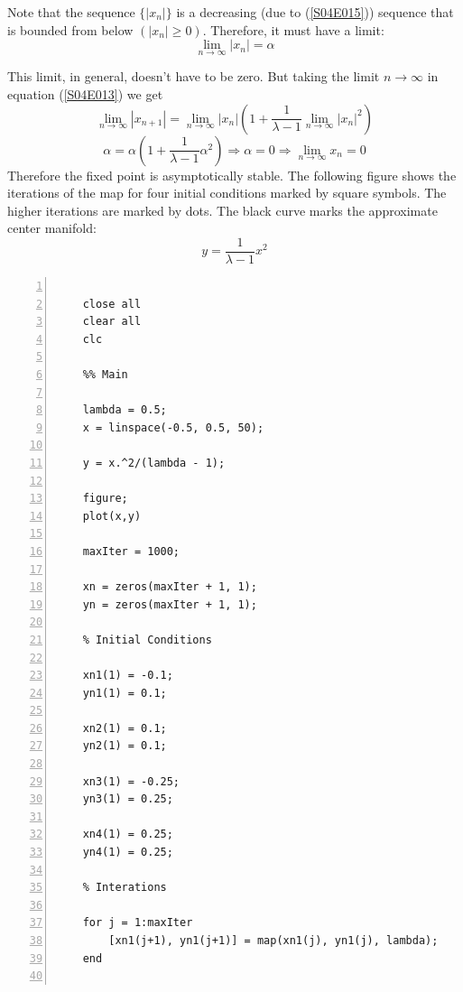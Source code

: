 \documentclass[twoside,10pt,a4paper]{article}
\begin{document}
\begin{enumerate}[label=(\alph*)]
Note that the sequence $\{|x_n|\}$ is a decreasing (due to (\ref{S04E015})) sequence that is bounded from below $(|x_n| \geq 0)$. Therefore, it must have a limit:
\begin{equation*}
	\lim_{n \rightarrow \infty} |x_n| = \alpha
\end{equation*}

This limit, in general, doesn't have to be zero. But taking the limit $n \rightarrow \infty$ in equation (\ref{S04E013}) we get
\begin{equation*}
	\lim_{n \rightarrow \infty} |x_{n+1}| = \lim_{n \rightarrow \infty}
	|x_n| \left( 1 + \frac{1}{\lambda - 1} \lim_{n \rightarrow \infty} |x_n|^2 \right)
\end{equation*}
\begin{equation*}
	\alpha = \alpha \left( 1 + \frac{1}{\lambda - 1} \alpha^2 \right) \Longrightarrow \alpha = 0 \Longrightarrow \lim_{n \rightarrow \infty} x_n = 0
\end{equation*}
Therefore the fixed point is asymptotically stable.
\vspace{15 pt}
The following figure shows the iterations of the map for four initial conditions marked by square symbols. The higher iterations are marked by dots. The black curve marks the approximate center manifold:
\begin{equation*}
	y = \frac{1}{\lambda - 1}x^2
\end{equation*}


\begin{Verbatim}[numbers = left]
	%% Initiation

	close all
	clear all
	clc

	%% Main

	lambda = 0.5;
	x = linspace(-0.5, 0.5, 50);
	
	y = x.^2/(lambda - 1);
	
	figure;
	plot(x,y)
	
	maxIter = 1000;
	
	xn = zeros(maxIter + 1, 1);
	yn = zeros(maxIter + 1, 1);
	
	% Initial Conditions
	
	xn1(1) = -0.1;
	yn1(1) = 0.1;
	
	xn2(1) = 0.1;
	yn2(1) = 0.1;
	
	xn3(1) = -0.25;
	yn3(1) = 0.25;
	
	xn4(1) = 0.25;
	yn4(1) = 0.25;
	
	% Interations
	
	for j = 1:maxIter
	    [xn1(j+1), yn1(j+1)] = map(xn1(j), yn1(j), lambda);
	end
	

\end{Verbatim}
\end{enumerate}
\end{document}
